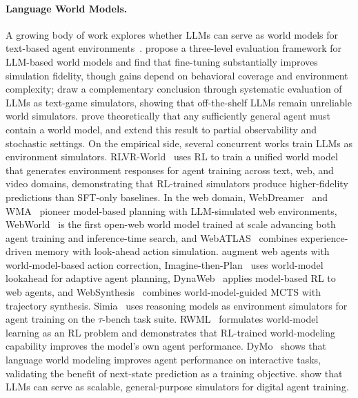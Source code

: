 \documentclass{llmxive}
\begin{document}
\paragraph{Language World Models.}
A growing body of work explores whether LLMs can serve as world models for text-based agent environments~\citep{li2026bridgingagentworldgaptext}.
\citet{li2025word} propose a three-level evaluation framework for LLM-based world models and find that fine-tuning substantially improves simulation fidelity, though gains depend on behavioral coverage and environment complexity; \citet{wang2024can} draw a complementary conclusion through systematic evaluation of LLMs as text-game simulators, showing that off-the-shelf LLMs remain unreliable world simulators.
\citet{richens2025general} prove theoretically that any sufficiently general agent must contain a world model, and \citet{cifuentes2026general} extend this result to partial observability and stochastic settings.
On the empirical side, several concurrent works train LLMs as environment simulators.
RLVR-World~\citep{wu2026rlvr} uses RL to train a unified world model that generates environment responses for agent training across text, web, and video domains, demonstrating that RL-trained simulators produce higher-fidelity predictions than SFT-only baselines.
In the web domain, WebDreamer~\citep{gu2024your} and WMA~\citep{chae2025web} pioneer model-based planning with LLM-simulated web environments, WebWorld~\citep{xiao2026webworld} is the first open-web world model trained at scale advancing both agent training and inference-time search, and WebATLAS~\citep{cheng2025webatlas} combines experience-driven memory with look-ahead action simulation.
\citet{shen2026world} augment web agents with world-model-based action correction, Imagine-then-Plan~\citep{liu2026imagine} uses world-model lookahead for adaptive agent planning, DynaWeb~\citep{ding2026dynaweb} applies model-based RL to web agents, and WebSynthesis~\citep{gao2025websynthesis} combines world-model-guided MCTS with trajectory synthesis.
Simia~\citep{li2025simulating} uses reasoning models as environment simulators for agent training on the $\tau$-bench task suite.
RWML~\citep{yu2026reinforcement} formulates world-model learning as an RL problem and demonstrates that RL-trained world-modeling capability improves the model's own agent performance.
DyMo~\citep{guo2025world} shows that language world modeling improves agent performance on interactive tasks, validating the benefit of next-state prediction as a training objective.
\citet{wang2025llms} show that LLMs can serve as scalable, general-purpose simulators for digital agent training.
\end{document}
